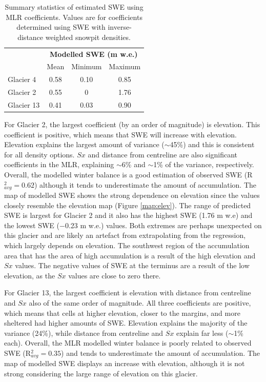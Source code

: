 \documentclass[12pt]{article}
\begin{document}
\begin{table}
\centering
\caption{Summary statistics of estimated SWE using MLR coefficients. Values are for coefficients determined using SWE with inverse-distance weighted snowpit densities. }
\label{tab:MLRsweMinMax}
\begin{tabular}{lccc}
\multicolumn{1}{l}{} & \multicolumn{3}{c}{\textbf{Modelled SWE (m w.e.)}} \\
                     & Mean          & Minimum          & Maximum         \\ \hline
Glacier 4            & 0.58          & 0.10             & 0.85            \\
Glacier 2            & 0.55          & 0            & 1.76            \\
Glacier 13           & 0.41          & 0.03             & 0.90           
\end{tabular}
\end{table} 

For Glacier 2, the largest coefficient (by an order of magnitude) is elevation. This coefficient is positive, which means that SWE will increase with elevation. Elevation explains the largest amount of variance ($\sim$45\%) and this is consistent for all density options. $Sx$ and distance from centreline are also significant coefficients in the MLR, explaining $\sim$6\% and $\sim$1\% of the variance, respectively.  Overall, the modelled winter balance is a good estimation of observed SWE (R$^2_{avg}=0.62$) although it tends to underestimate the amount of accumulation. The map of modelled SWE shows the strong dependence on elevation since the values closely resemble the elevation map (Figure \ref{map:elev}). The range of predicted SWE is largest for Glacier 2 and it also has the highest SWE (1.76 m w.e) and the lowest SWE ($-$0.23 m w.e.) values. Both extremes are perhaps unexpected on this glacier and are likely an artefact from extrapolating from the regression, which largely depends on elevation. The southwest region of the accumulation area that has the area of high accumulation is a result of the high elevation and $Sx$ values. The negative values of SWE at the terminus are a result of the low elevation, as the $Sx$ values are close to zero there. 

For Glacier 13, the largest coefficient is elevation with distance from centreline and $Sx$ also of the same order of magnitude. All three coefficients are positive, which means that cells at higher elevation, closer to the margins, and more sheltered had higher amounts of SWE. Elevation explains the majority of the variance (24\%), while distance from centreline and $Sx$ explain far less ($\sim$1\% each).  Overall, the MLR modelled winter balance is poorly related to observed SWE (R$^2_{avg}=0.35$) and tends to underestimate the amount of accumulation. The map of modelled SWE displays an increase with elevation, although it is not strong considering the large range of elevation on this glacier.
\end{document}
